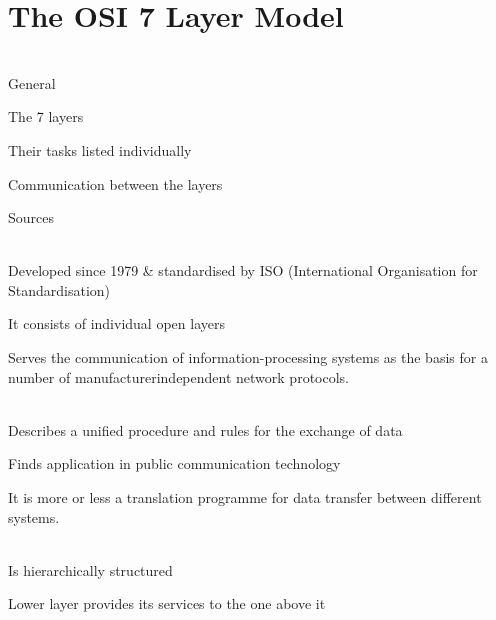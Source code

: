 

\section{The OSI 7 Layer Model}

\begin{description}



\os{\newpage}\item[{\rot\bf  Structure }]~\\[-3ex]

\bi
  \ite General

  \ite The 7 layers

  \ite Their tasks listed individually

  \ite Communication between the layers

  \ite Sources

\ei


\os{\newpage}\item[{\rot\bf  General }]~\\[-3ex]

\bi
  \ite Developed since 1979 \& standardised by ISO (International Organisation for Standardisation)

  \ite It consists of individual open layers

  \ite Serves the communication of information-processing systems as the basis for a number of manufacturerindependent network protocols.

\ei


\os{\newpage}\item[{\rot\bf  General }]~\\[-3ex]

\bi
  \ite Describes a unified procedure and rules for the exchange of data

  \ite Finds application in public communication technology

  \ite It is more or less a translation programme for data transfer between different systems.

\ei


\os{\newpage}\item[{\rot\bf  General }]~\\[-3ex]

\bi
  \ite Is hierarchically structured

  \ite Lower layer provides its services to the one above it

\ei


\os{\newpage}\item[{\rot\bf  The 7 layers }]~\\[-3ex]


\end{description}
